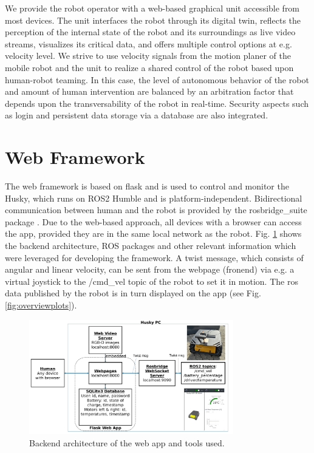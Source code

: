 \documentclass[letterpaper, 10 pt, conference]{ieeeconf}  %
\begin{document}
We  provide the robot operator with a web-based graphical unit accessible from most devices. The unit interfaces the robot through its digital twin, reflects the perception of the internal state of the robot and its surroundings as live video streams, visualizes its critical data, and offers multiple control options at e.g. velocity level. We strive to use  velocity signals from the motion planer of the mobile robot and the unit to realize a shared control \cite{phri} of the robot based upon human-robot teaming. In this case, the level of autonomous  behavior of the robot and amount of human intervention are  balanced by an arbitration factor that depends upon the transversability of the robot in real-time. Security aspects such as login and persistent data storage via a database are also integrated. 


\section{Web Framework}

The web framework is based on flask \cite{flask} and is used to control and monitor the Husky, which runs on ROS2 Humble and is platform-independent. 
Bidirectional communication between human and the robot is provided by the rosbridge\_suite package \cite{rosbridgeSuite}.   
Due to the web-based approach, all devices with a browser can access the app, provided they are in the same local network as the robot.
Fig. \ref{fig:userapp} shows the backend architecture, ROS packages and other relevant information which were leveraged for developing the framework. 
A twist message, which consists of angular and linear velocity, can be sent from the webpage (fronend) via e.g. 
a virtual joystick to the /cmd\_vel topic of the robot to set it in motion. The ros data published by the robot is in turn displayed on the app (see Fig. \ref{fig:overviewplots}).

\begin{figure}[b]
    \centerline{\includegraphics[width=8.9cm]{images/ROS_Web_App_Architecture.pdf}}
    \caption{Backend architecture of the web app and tools used.}
    \label{fig:userapp}
\end{figure}
\end{document}
